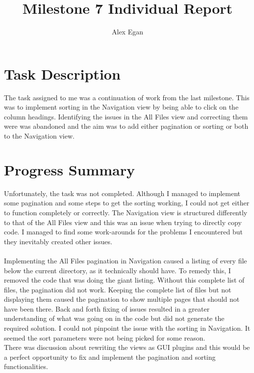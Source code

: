 \documentclass[10pt, a4]{article}
\begin{document}
\title{Milestone 7 Individual Report}
\author{Alex Egan}
\date{ }

\maketitle
 
\section{Task Description}
The task assigned to me was a continuation of work from the last milestone. This was to implement sorting in the Navigation view by being able to click on the column headings. Identifying the issues in the All Files view and correcting them were was abandoned and the aim was to add either pagination or sorting or both to the Navigation view.

\section{Progress Summary}
\label{prog-sum}
Unfortunately, the task was not completed. Although I managed to implement some pagination and some steps to get the sorting working, I could not get either to function completely or correctly. The Navigation view is structured differently to that of the All Files view and this was an issue when trying to directly copy code. I managed to find some work-arounds for the problems I encountered but they inevitably created other issues.\\
\\
Implementing the All Files pagination in Navigation caused a listing of every file below the current directory, as it technically should have. To remedy this, I removed the code that was doing the giant listing. Without this complete list of files, the pagination did not work. Keeping the complete list of files but not displaying them caused the pagination to show multiple pages that should not have been there. Back and forth fixing of issues resulted in a greater understanding of what was going on in the code but did not generate the required solution. I could not pinpoint the issue with the sorting in Navigation. It seemed the sort parameters were not being picked for some reason.
\\
There was discussion about rewriting the views as GUI plugins and this would be a perfect opportunity to fix and implement the pagination and sorting functionalities.
\end{document}
